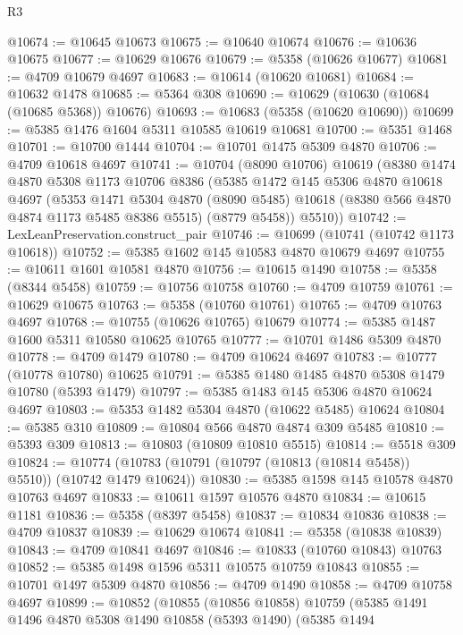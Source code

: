 \begin{lexlean}{R3}
\begin{coremodule}
@10674 := @10645 @10673
@10675 := @10640 @10674
@10676 := @10636 @10675
@10677 := @10629 @10676
@10679 := @5358 (@10626 @10677)
@10681 := @4709 @10679 @4697
@10683 := @10614 (@10620 @10681)
@10684 := @10632 @1478
@10685 := @5364 @308
@10690 := @10629 (@10630 (@10684 (@10685 @5368)) @10676)
@10693 := @10683 (@5358 (@10620 @10690))
@10699 := @5385 @1476 @1604 @5311 @10585 @10619 @10681
@10700 := @5351 @1468
@10701 := @10700 @1444
@10704 := @10701 @1475 @5309 @4870
@10706 := @4709 @10618 @4697
@10741 := @10704
    (@8090 @10706)
    @10619
    (@8380
      @1474
      @4870
      @5308
      @1173
      @10706
      @8386
      (@5385
        @1472
        @145
        @5306
        @4870
        @10618
        @4697
        (@5353
          @1471
          @5304
          @4870
          (@8090 @5485)
          @10618
          (@8380 @566 @4870 @4874 @1173 @5485 @8386 @5515)
          (@8779 @5458))
        @5510))
@10742 := LexLeanPreservation.construct_pair
@10746 := @10699 (@10741 (@10742 @1173 @10618))
@10752 := @5385 @1602 @145 @10583 @4870 @10679 @4697
@10755 := @10611 @1601 @10581 @4870
@10756 := @10615 @1490
@10758 := @5358 (@8344 @5458)
@10759 := @10756 @10758
@10760 := @4709 @10759
@10761 := @10629 @10675
@10763 := @5358 (@10760 @10761)
@10765 := @4709 @10763 @4697
@10768 := @10755 (@10626 @10765) @10679
@10774 := @5385 @1487 @1600 @5311 @10580 @10625 @10765
@10777 := @10701 @1486 @5309 @4870
@10778 := @4709 @1479
@10780 := @4709 @10624 @4697
@10783 := @10777 (@10778 @10780) @10625
@10791 := @5385 @1480 @1485 @4870 @5308 @1479 @10780 (@5393 @1479)
@10797 := @5385 @1483 @145 @5306 @4870 @10624 @4697
@10803 := @5353 @1482 @5304 @4870 (@10622 @5485) @10624
@10804 := @5385 @310
@10809 := @10804 @566 @4870 @4874 @309 @5485
@10810 := @5393 @309
@10813 := @10803 (@10809 @10810 @5515)
@10814 := @5518 @309
@10824 := @10774 (@10783 (@10791 (@10797 (@10813 (@10814 @5458)) @5510)) (@10742 @1479 @10624))
@10830 := @5385 @1598 @145 @10578 @4870 @10763 @4697
@10833 := @10611 @1597 @10576 @4870
@10834 := @10615 @1181
@10836 := @5358 (@8397 @5458)
@10837 := @10834 @10836
@10838 := @4709 @10837
@10839 := @10629 @10674
@10841 := @5358 (@10838 @10839)
@10843 := @4709 @10841 @4697
@10846 := @10833 (@10760 @10843) @10763
@10852 := @5385 @1498 @1596 @5311 @10575 @10759 @10843
@10855 := @10701 @1497 @5309 @4870
@10856 := @4709 @1490
@10858 := @4709 @10758 @4697
@10899 := @10852
    (@10855
      (@10856 @10858)
      @10759
      (@5385
        @1491
        @1496
        @4870
        @5308
        @1490
        @10858
        (@5393 @1490)
        (@5385
          @1494

\end{coremodule}
\end{lexlean}
